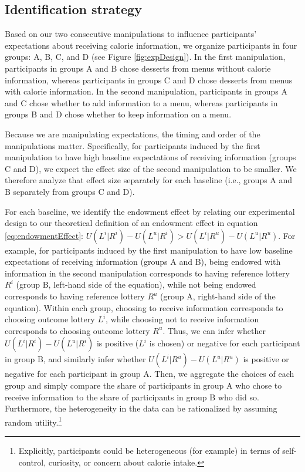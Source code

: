 \documentclass[12pt]{article}
\begin{document}
\subsection{Identification strategy}

Based on our two consecutive manipulations to influence participants’ expectations about receiving calorie information, we organize participants in four groups: A, B, C, and D (see Figure \ref{fig:expDesign}). In the first manipulation, participants in groups A and B chose desserts from menus without calorie information, whereas participants in groups C and D chose desserts from menus with calorie information. In the second manipulation, participants in groups A and C chose whether to add information to a menu, whereas participants in groups B and D chose whether to keep information on a menu.

Because we are manipulating expectations, the timing and order of the manipulations matter. Specifically, for participants induced by the first manipulation to have high baseline expectations of receiving information (groups C and D), we expect the effect size of the second manipulation to be smaller. We therefore analyze that effect size separately for each baseline (i.e., groups A and B separately from groups C and D).

For each baseline, we identify the endowment effect by relating our experimental design to our theoretical definition of an endowment effect in equation \ref{eq:endowmentEffect}: $U(L^i|R^i)-U(L^u|R^i)>U(L^i|R^u)-U(L^u|R^u)$. For example, for participants induced by the first manipulation to have low baseline expectations of receiving information (groups A and B), being endowed with information in the second manipulation corresponds to having reference lottery $R^i$ (group B, left-hand side of the equation), while not being endowed corresponds to having reference lottery $R^u$ (group A, right-hand side of the equation). Within each group, choosing to receive information corresponds to choosing outcome lottery $L^i$, while choosing not to receive information corresponds to choosing outcome lottery $R^u$. Thus, we can infer whether $U(L^i|R^i)-U(L^u|R^i)$ is positive ($L^i$ is chosen) or negative for each participant in group B, and similarly infer whether $U(L^i|R^u)-U(L^u|R^u)$ is positive or negative for each participant in group A. Then, we aggregate the choices of each group and simply compare the share of participants in group A who chose to receive information to the share of participants in group B who did so. Furthermore, the heterogeneity in the data can be rationalized by assuming random utility.\footnote{Explicitly, participants could be heterogeneous (for example) in terms of self-control, curiosity, or concern about calorie intake.}
\end{document}
